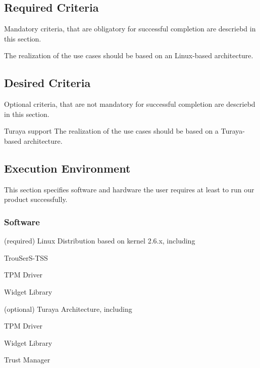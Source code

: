 \documentclass[
  american        %
]{sirrixreport}
\begin{document}
\subsection{Required Criteria}

Mandatory criteria, that are obligatory for successful completion are descriebd in this section.

The realization of the use cases should be based on an Linux-based architecture.


\subsection{Desired Criteria}

  Optional criteria, that are not mandatory for successful completion are descriebd in this section.

 {Turaya support} 
The realization of the use cases should be based on a Turaya-based architecture.

\subsection{Execution Environment}

   This section specifies software and hardware the user requires at
   least to run our product successfully.


\subsubsection{Software}
\label{subsec:software}
\begin{compactitem}
 \item (required) Linux Distribution based on kernel 2.6.x, including
   \begin{compactitem}
      \item TrouSerS-TSS
      \item TPM Driver
      \item Widget Library
   \end{compactitem}
 \item (optional) Turaya Architecture, including
   \begin{compactitem}
      \item TPM Driver
      \item Widget Library
      \item Trust Manager
   \end{compactitem}
\end{compactitem}
\end{document}
